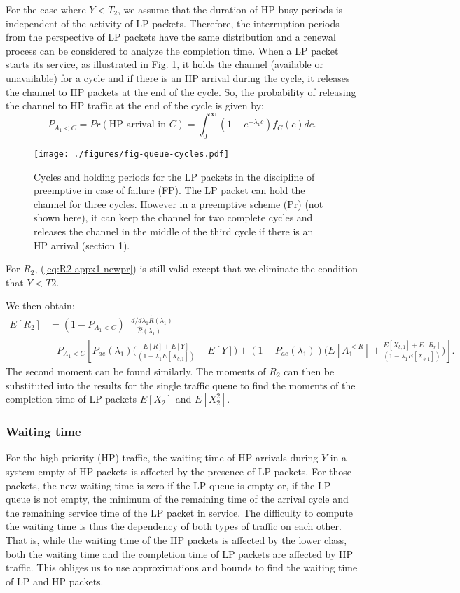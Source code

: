\documentclass[11pt,journal,oneside,onecolumn,draftclsnofoot]{IEEEtran}
\begin{document}
For the case where $Y < T_2$, we assume that the duration of HP busy periods is independent of the activity of LP packets. Therefore, the interruption periods from the perspective of LP packets have the same distribution and  a renewal process can be considered to analyze the completion time. When a LP packet starts its service, as illustrated in Fig. \ref{fig-queue-cycles}, it holds the channel (available or unavailable) for a cycle and if there is an HP arrival during the cycle, it releases the channel to HP packets at the end of the cycle. So, the probability of releasing the channel to HP traffic at the end of the cycle is given by:
\begin{equation}
P_{A_1<C}=Pr(\mbox{HP arrival in $C$}) 
=\int_{0}^{\infty}{(1-e^{-\lambda_1 c}) f_C(c)dc}.
\label{prob-of-an-arrival-in-c}
\end{equation}
\begin{figure}\texttt{[image: ./figures/fig-queue-cycles.pdf]}\caption{Cycles and holding periods for the LP packets in the discipline of preemptive in case of failure (FP). The LP packet can hold the channel for three cycles. However in a preemptive scheme (Pr) (not shown here), it can keep the channel for two complete cycles and releases the channel in the middle of the third cycle if there is an HP arrival (section 1). }
\label{fig-queue-cycles}\end{figure}
For $R_2$, (\ref{eq:R2-appx1-newpr}) is still valid except that we eliminate the condition that $Y<T2$.


We then obtain:
\begin{align}
E[R_2]&=(1-P_{A_1<C}) \frac{-d/d\lambda_1 \widehat{R}(\lambda_1)}{\widehat{R}(\lambda_1)} \nonumber \\
&+P_{A_1<C}\left[P_{ae}(\lambda_1)\Bigg(\frac{E[R]+E[Y]}{(1-\lambda_1E[X_{b,1}])}-E[Y]\Bigg)+(1-P_{ae}(\lambda_1))\Bigg(E[A_1^{<R}] + \frac{E[X_{b,1}]+E[R_r]}{(1-\lambda_1E[X_{b,1}])}\Bigg)\right].
\label{eq:eq:R2-appx2-newpr}
\end{align}
The second moment can be found similarly. The moments of $R_2$ can then be substituted into the results for the single traffic queue  to find the moments of the completion time of LP packets $E[X_2]$ and $E[X_2^2]$.


\subsubsection{Waiting time}
\label{subsec:prf-Waiting-time}
For the high priority (HP) traffic, the waiting time of HP arrivals during $Y$ in a system empty of HP packets is affected by the presence of LP packets. For those packets, the new waiting time is zero if the LP queue is empty or, if the LP queue is not empty, the minimum of the remaining time of the arrival cycle and the remaining service time of the LP packet in service. The difficulty to compute the waiting time is thus the dependency of both types of traffic on each other. That is, while the waiting time of the HP packets is affected by the lower class, both the waiting time and the completion time of LP packets are affected by HP traffic. This obliges us to use approximations and bounds to find the waiting time of LP and HP packets. 
\end{document}
